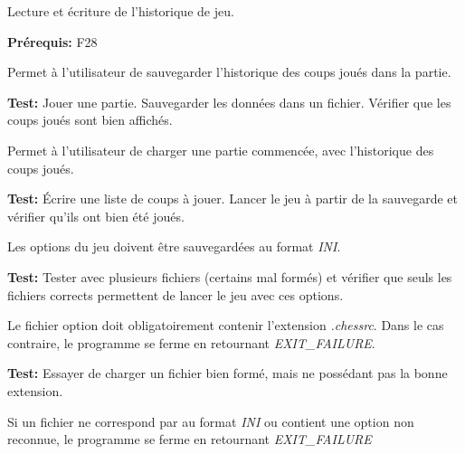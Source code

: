 \documentclass{article}
\begin{document}
\begin{nonfunctionnalneedbox}
    Lecture et écriture de l'historique de jeu.

    \textbf{Prérequis:} F28
    \begin{subneedbox}
        Permet à l'utilisateur de sauvegarder l'historique des coups joués dans la partie.

        \textbf{Test:} Jouer une partie. Sauvegarder les données dans un fichier. Vérifier
        que les coups joués sont bien affichés.
    \end{subneedbox}
    \begin{subneedbox}
        Permet à l'utilisateur de charger une partie commencée, avec l'historique des coups joués.

        \textbf{Test:} Écrire une liste de coups à jouer. Lancer le jeu à partir de la sauvegarde et
        vérifier qu'ils ont bien été joués.
    \end{subneedbox}
\end{nonfunctionnalneedbox}

\begin{nonfunctionnalneedbox}
    \begin{subneedbox}
        Les options du jeu doivent être sauvegardées au format \textit{INI}.

        \textbf{Test:} Tester avec plusieurs fichiers (certains mal formés) et vérifier 
        que seuls les fichiers corrects permettent de lancer le jeu avec ces options.
    \end{subneedbox}
    \begin{subneedbox}
        Le fichier option doit obligatoirement contenir l'extension \textit{.chessrc}.
        Dans le cas contraire, le programme se ferme en retournant \textit{EXIT\_FAILURE}.

        \textbf{Test:} Essayer de charger un fichier bien formé, mais ne possédant
        pas la bonne extension.
    \end{subneedbox}
    \begin{subneedbox}
        Si un fichier ne correspond par au format \textit{INI} ou contient une 
        option non reconnue, le programme se ferme en retournant \textit{EXIT\_FAILURE}
    \end{subneedbox}
    
\end{nonfunctionnalneedbox}
\end{document}
